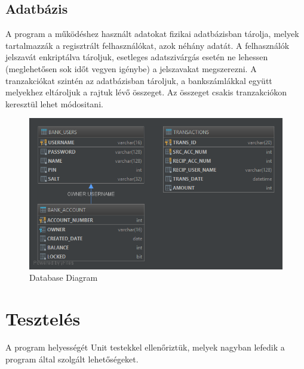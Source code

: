 \documentclass{article}
\begin{document}
\subsection{Adatbázis}
A program a működéshez használt adatokat fizikai adatbázisban tárolja, melyek tartalmazzák a  regisztrált felhasználókat, azok néhány adatát. A felhasználók jelszavát enkriptálva tároljuk, esetleges adatszivárgás esetén ne lehessen (meglehetősen sok időt vegyen igénybe) a jelszavakat megszerezni. A tranzakciókat szintén az adatbázisban tároljuk, a bankszámlákkal együtt melyekhez eltároljuk a rajtuk lévő összeget. Az összeget csakis tranzakciókon keresztül lehet módositani.
\begin{figure}[h]
	\caption{Database Diagram}
	\includegraphics[scale=0.5]{DatabaseUML}
\end{figure}
\pagebreak
\section{Tesztelés}
A program helyességét Unit testekkel ellenőriztük, melyek nagyban lefedik a program által szolgált lehetőségeket. 
\end{document}
